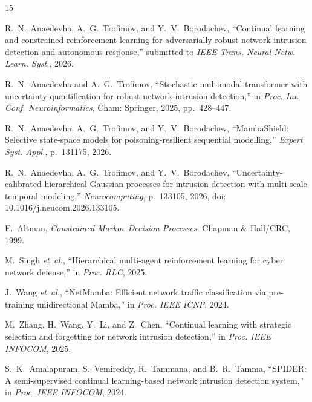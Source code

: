 \documentclass[12pt,a4paper]{article}
\theoremstyle{definition}
\begin{document}

\begin{thebibliography}{15}

R.~N.~Anaedevha, A.~G.~Trofimov, and Y.~V.~Borodachev,
``Continual learning and constrained reinforcement learning for adversarially robust network intrusion detection and autonomous response,''
submitted to \emph{IEEE Trans. Neural Netw. Learn. Syst.}, 2026.

R.~N.~Anaedevha and A.~G.~Trofimov,
``Stochastic multimodal transformer with uncertainty quantification for robust network intrusion detection,''
in \emph{Proc. Int. Conf. Neuroinformatics}, Cham: Springer, 2025, pp.~428--447.

R.~N.~Anaedevha, A.~G.~Trofimov, and Y.~V.~Borodachev,
``{MambaShield}: Selective state-space models for poisoning-resilient sequential modelling,''
\emph{Expert Syst. Appl.}, p.~131175, 2026.

R.~N.~Anaedevha, A.~G.~Trofimov, and Y.~V.~Borodachev,
``Uncertainty-calibrated hierarchical {G}aussian processes for intrusion detection with multi-scale temporal modeling,''
\emph{Neurocomputing}, p.~133105, 2026, doi: 10.1016/j.neucom.2026.133105.

E.~Altman,
\emph{Constrained Markov Decision Processes}.
Chapman \& Hall/CRC, 1999.

M.~Singh \textit{et~al.},
``Hierarchical multi-agent reinforcement learning for cyber network defense,''
in \emph{Proc. RLC}, 2025.

J.~Wang \textit{et~al.},
``{NetMamba}: Efficient network traffic classification via pre-training unidirectional {Mamba},''
in \emph{Proc. IEEE ICNP}, 2024.

M.~Zhang, H.~Wang, Y.~Li, and Z.~Chen,
``Continual learning with strategic selection and forgetting for network intrusion detection,''
in \emph{Proc. IEEE INFOCOM}, 2025.

S.~K.~Amalapuram, S.~Vemireddy, R.~Tammana, and B.~R.~Tamma,
``{SPIDER}: A semi-supervised continual learning-based network intrusion detection system,''
in \emph{Proc. IEEE INFOCOM}, 2024.

\end{thebibliography}
\end{document}
